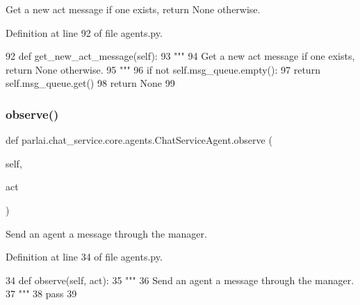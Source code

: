 \begin{DoxyVerb}Get a new act message if one exists, return None otherwise.
\end{DoxyVerb}
 

Definition at line 92 of file agents.\+py.


\begin{DoxyCode}
92     \textcolor{keyword}{def }get\_new\_act\_message(self):
93         \textcolor{stringliteral}{"""}
94 \textcolor{stringliteral}{        Get a new act message if one exists, return None otherwise.}
95 \textcolor{stringliteral}{        """}
96         \textcolor{keywordflow}{if} \textcolor{keywordflow}{not} self.msg\_queue.empty():
97             \textcolor{keywordflow}{return} self.msg\_queue.get()
98         \textcolor{keywordflow}{return} \textcolor{keywordtype}{None}
99 
\end{DoxyCode}
\mbox{\label{classparlai_1_1chat__service_1_1core_1_1agents_1_1ChatServiceAgent_a4b7ec3cb69f7e3f00b160f8474c344cc}} 
\subsubsection{\texorpdfstring{observe()}{observe()}}
{\footnotesize\ttfamily def parlai.\+chat\+\_\+service.\+core.\+agents.\+Chat\+Service\+Agent.\+observe (\begin{DoxyParamCaption}\item[{}]{self,  }\item[{}]{act }\end{DoxyParamCaption})}

\begin{DoxyVerb}Send an agent a message through the manager.
\end{DoxyVerb}
 

Definition at line 34 of file agents.\+py.


\begin{DoxyCode}
34     \textcolor{keyword}{def }observe(self, act):
35         \textcolor{stringliteral}{"""}
36 \textcolor{stringliteral}{        Send an agent a message through the manager.}
37 \textcolor{stringliteral}{        """}
38         \textcolor{keywordflow}{pass}
39 
\end{DoxyCode}
\mbox{\label{classparlai_1_1chat__service_1_1core_1_1agents_1_1ChatServiceAgent_a7a066db782ac2ebd1e2f704354c9f348}} 
